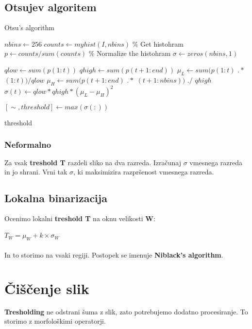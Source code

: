 \documentclass[11pt]{article}
\begin{document}
\newpage

\subsection{Otsujev algoritem}

\begin{algorithm}
\caption{Otsu's algorithm}\label{euclid}
\begin{algorithmic}[1]


\State $\textit{nbins} \gets 256$
\State $counts \gets myhist(I, nbins)$ \% Get histohram
\State $\textit{p} \gets counts / sum(counts)$ \% Normalize the histohram
\State $\sigma \gets zeros(nbins, 1)$

\State $qlow \gets sum(p(1:t))$
\State $qhigh \gets sum(p(t + 1 : end))$
\State $\mu_L \gets sum(p(1:t)$ $.*$ $(1:t)) / qlow$ 
\State $\mu_H \gets sum(p(t + 1 : end)$ $.*$ $(t + 1 : nbins))$ $./$ $qhigh$
\State $\sigma(t) \gets qlow * qhigh * (\mu_L - \mu_H) ^ 2$
\EndFor

\State $[\sim, threshold] \gets max(\sigma(:))$

\Return threshold

\EndProcedure
\end{algorithmic}
\end{algorithm}

\subsubsection*{Neformalno}
Za vsak \textbf{treshold T} razdeli sliko na dva razreda. Izra\v{c}unaj $\sigma$ vmesnega razreda in jo shrani. Vrni tak $\sigma$, ki maksimizira razpr\v{s}enost vmesnega razreda.

\subsection{Lokalna binarizacija}
Ocenimo lokalni \textbf{treshold T} na oknu velikosti \textbf{W}: \\
\\
\indent $T_W = \mu_W + k \times \sigma_W$ \\
\\
In to storimo na vsaki regiji. Postopek se imenuje \textbf{Niblack's algorithm}.

\newpage

\section{\v{C}i\v{s}\v{c}enje slik}
\textbf{Tresholding} ne odstrani \v{s}uma z slik, zato potrebujemo dodatno procesiranje. To storimo z morfolo\v{s}kimi operatorji.
\end{document}
